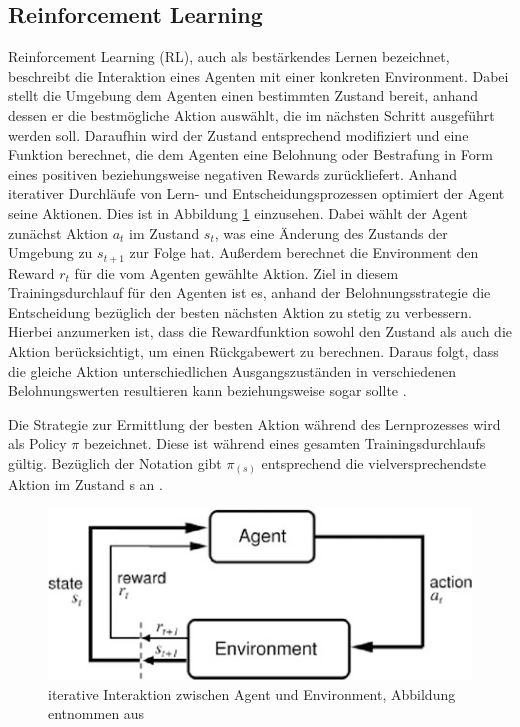 \documentclass[12pt,a4paper]{article}
\begin{document}
\subsection{Reinforcement Learning}
Reinforcement Learning (RL), auch als bestärkendes Lernen bezeichnet, beschreibt die Interaktion eines Agenten mit einer konkreten Environment. Dabei stellt die Umgebung dem Agenten einen bestimmten Zustand bereit, anhand dessen er die bestmögliche Aktion auswählt, die im nächsten Schritt ausgeführt werden soll. Daraufhin wird der Zustand entsprechend modifiziert und eine Funktion berechnet, die dem Agenten eine Belohnung oder Bestrafung in Form eines positiven beziehungsweise negativen Rewards zurückliefert. Anhand iterativer Durchläufe von Lern- und Entscheidungsprozessen optimiert der Agent seine Aktionen. Dies ist in Abbildung \ref{fig:rl_agent_loop} einzusehen. Dabei wählt der Agent zunächst Aktion $a_{t}$ im Zustand $s_{t}$, was eine Änderung des Zustands der Umgebung zu $s_{t+1}$ zur Folge hat. Außerdem berechnet die Environment den Reward $r_{t}$ für die vom Agenten gewählte Aktion. Ziel in diesem Trainingsdurchlauf für den Agenten ist es, anhand der Belohnungsstrategie die Entscheidung bezüglich der besten nächsten Aktion zu stetig zu verbessern. Hierbei anzumerken ist, dass die Rewardfunktion sowohl den Zustand als auch die Aktion berücksichtigt, um einen Rückgabewert zu berechnen. Daraus folgt, dass die gleiche Aktion unterschiedlichen Ausgangszuständen in verschiedenen Belohnungswerten resultieren kann beziehungsweise sogar sollte \cite[S. 2]{Sewak2019}.

Die Strategie zur Ermittlung der besten Aktion während des Lernprozesses wird als Policy $\pi$ bezeichnet. Diese ist während eines gesamten Trainingsdurchlaufs gültig. Bezüglich der Notation gibt $\pi_{(s)}$ entsprechend die vielversprechendste Aktion im Zustand s an \cite[S. 16]{Sewak2019}.

\begin{figure}
\centering
\includegraphics{pics/rl_agent_loop.png}	\caption{iterative Interaktion zwischen Agent und Environment, Abbildung entnommen aus \cite[S. 2]{Sewak2019}}
\label{fig:rl_agent_loop}
\end{figure}
\end{document}
